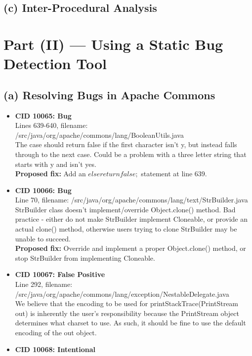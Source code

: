 \documentclass{article}
\begin{document}
\subsection*{(c) Inter-Procedural Analysis}

\section*{Part (II) --- Using a Static Bug Detection Tool}

\subsection*{(a) Resolving Bugs in Apache Commons}
\begin{itemize}
\item \textbf{CID 10065: Bug} \\
    Lines 639-640, filename: /src/java/org/apache/commons/lang/BooleanUtils.java \\
    The case should return false if the first character isn't y, but instead falls through to the next case.
    Could be a problem with a three letter string that starts with y and isn't yes. \\
    \textbf{Proposed fix:} Add an $else { return false; }$ statement at line 639.
\item \textbf{CID 10066: Bug} \\
    Line 70, filename: /src/java/org/apache/commons/lang/text/StrBuilder.java \\
    StrBuilder class doesn't implement/override Object.clone() method. Bad practice - either do not make
    StrBuilder implement Cloneable, or provide an actual clone() method, otherwise users trying to clone
    StrBuilder may be unable to succeed. \\
    \textbf{Proposed fix:} Override and implement a proper Object.clone() method, or stop StrBuilder from 
    implementing Cloneable.
\item \textbf{CID 10067: False Positive} \\
    Line 292, filename: /src/java/org/apache/commons/lang/exception/NestableDelegate.java \\
    We believe that the encoding to be used for printStackTrace(PrintStream out) is inherently the user's responsibility because
    the PrintStream object determines what charset to use. As such, it should be fine to use the default encoding of the out object.
\item \textbf{CID 10068: Intentional} \\

\end{itemize}
\end{document}
